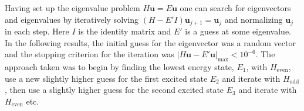 \documentclass[twocolumn]{article}
\begin{document}
\begin{large}
Having set up the eigenvalue problem $H\mathbf{u} = E\mathbf{u}$ one can search for eigenvectors and eigenvalues by iteratively solving $(H-E'I)\mathbf{u}_{j+1} = \mathbf{u}_j$ and normalizing $\mathbf{u}_j$ in each step. Here $I$ is the identity matrix and $E'$ is a guess at some eigenvalue. In the following results, the initial guess for the eigenvector was a random vector and the stopping criterion for the iteration was $|H\mathbf{u}-E'\mathbf{u}|_\text{max}<10^{-6}$. The approach taken was to begin by finding the lowest energy state, $E_1$, with $H_\text{even}$, use a new slightly higher guess for the first excited state $E_2$ and iterate with $H_\text{odd}$, then use a slightly higher guess for the second excited state $E_3$ and iterate with $H_\text{even}$ etc.



\end{large}
\end{document}
